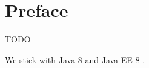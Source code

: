 %

\chapter*{Preface}
TODO

We stick with Java 8 \cite{GoslingJoyEtAl14} and Java EE 8 \cite{JavaEE8}.
